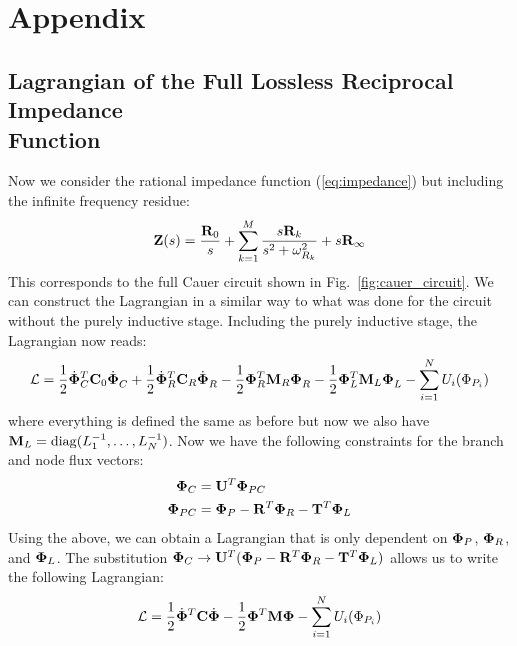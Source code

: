 \chapter{Appendix}

\section[Lagrangian of the Full Lossless Reciprocal Impedance Function]{Lagrangian of the Full Lossless Reciprocal Impedance\\ Function}\label{appendix:infty_freq_residue}
Now we consider the rational impedance function (\ref{eq:impedance}) but including the infinite frequency residue:
\begin{equation}
    \vb{Z}(s) = \frac{\vb{R}_0}{s} + \sum_{k=1}^M \frac{s \vb{R}_k}{s^2 + \omega_{R_k}^2} + s\vb{R}_\infty
\end{equation}
This corresponds to the full Cauer circuit shown in Fig.\ \ref{fig:cauer_circuit}. We can construct the Lagrangian in a similar way to what was done for the circuit without the purely inductive stage. Including the purely inductive stage, the Lagrangian now reads:
\begin{equation}
    \mathcal{L} = \frac{1}{2}\dot{\vb{\Phi}}_C^T \vb{C}_0 \dot{\vb{\Phi}}_C^{\phantom{^T}} + \frac{1}{2}\dot{\vb{\Phi}}_R^T \vb{C}_R \dot{\vb{\Phi}}_R^{\phantom{^T}} - \frac{1}{2}\vb{\Phi}_R^T \vb{M}_R \vb{\Phi}_R^{\phantom{^T}} - \frac{1}{2}\vb{\Phi}_L^T \vb{M}_L \vb{\Phi}_L^{\phantom{^T}} - \sum_{i=1}^N U_i(\Phi_{P_i})
\end{equation}
where everything is defined the same as before but now we also have $\vb{M}_L=\operatorname{diag}(L_1^{-1},\dots,L_N^{-1})$. Now we have the following constraints for the branch and node flux vectors:
\begin{align}
    \vb{\Phi}_C &= \vb{U}^T \vb{\Phi}_{PC} \\
    \vb{\Phi}_{PC} &= \vb{\Phi}_P - \vb{R}^T \vb{\Phi}_R - \vb{T}^T \vb{\Phi}_L
\end{align}
Using the above, we can obtain a Lagrangian that is only dependent on $\vb{\Phi}_P$, $\vb{\Phi}_R$, and $\vb{\Phi}_L$. The substitution $\vb{\Phi}_C \rightarrow \vb{U}^T (\vb{\Phi}_P - \vb{R}^T\vb{\Phi}_R  - \vb{T}^T \vb{\Phi}_L)$ allows us to write the following Lagrangian:
\begin{equation}
    \mathcal{L} =  \frac{1}{2}\dot{\vb{\Phi}}^T \vb{C} \dot{\vb{\Phi}} - \frac{1}{2}\vb{\Phi}^T \vb{M} \vb{\Phi}- \sum_{i=1}^N U_i(\Phi_{P_i})
\end{equation}
